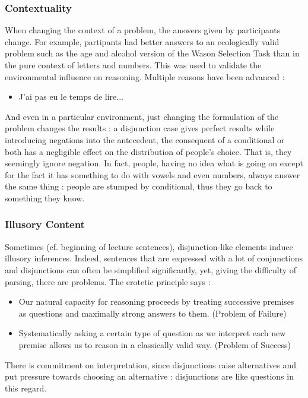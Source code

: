 \documentclass{cours}
\begin{document}
\subsubsection{Contextuality}
When changing the context of a problem, the answers given by participants change. For example, partipants had better answers to an ecologically valid problem such as the age and alcohol version of the Wason Selection Task than in the pure context of letters and numbers. This was used to validate the environmental influence on reasoning. Multiple reasons have been advanced :
\begin{itemize}
    \item J'ai pas eu le temps de lire...
\end{itemize}
And even in a particular environment, just changing the formulation of the problem changes the results : a disjunction case gives perfect results while introducing negations into the antecedent, the consequent of a conditional or both has a negligible effect on the distribution of people's choice. That is, they seemingly ignore negation. In fact, people, having no idea what is going on except for the fact it has something to do with vowels and even numbers, always answer the same thing : people are stumped by conditional, thus they go back to something they know. \\

\subsubsection{Illusory Content}
Sometimes (cf. beginning of lecture sentences), disjunction-like elements induce illusory inferences. Indeed, sentences that are expressed with a lot of conjunctions and disjunctions can often be simplified significantly, yet, giving the difficulty of parsing, there are problems. The erotetic principle says :
\begin{itemize}
    \item Our natural capacity for reasoning proceeds by treating successive premises as questions and maximally strong answers to them. (Problem of Failure)
    \item Systematically asking a certain type of question as we interpret each new premise allows us to reason in a classically valid way. (Problem of Success)
\end{itemize}
There is commitment on interpretation, since disjunctions raise alternatives and put pressure towards choosing an alternative : disjunctions are like questions in this regard.
\end{document}
